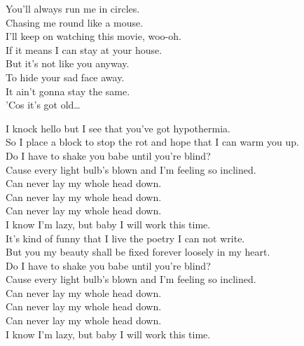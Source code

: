 You'll always run me in circles. \\
Chasing me round like a mouse. \\
I'll keep on watching this movie, woo-oh. \\
If it means I can stay at your house. \\
But it's not like you anyway. \\
To hide your sad face away. \\
It ain't gonna stay the same. \\
'Cos it's got old… \\





I knock hello but I see that you've got hypothermia. \\
So I place a block to stop the rot and hope that I can warm you up. \\
Do I have to shake you babe until you're blind? \\
Cause every light bulb's blown and I'm feeling so inclined. \\

Can never lay my whole head down. \\
Can never lay my whole head down. \\
Can never lay my whole head down. \\
I know I'm lazy, but baby I will work this time. \\

It's kind of funny that I live the poetry I can not write. \\
But you my beauty shall be fixed forever loosely in my heart. \\
Do I have to shake you babe until you're blind? \\
Cause every light bulb's blown and I'm feeling so inclined. \\

Can never lay my whole head down. \\
Can never lay my whole head down. \\
Can never lay my whole head down. \\
I know I'm lazy, but baby I will work this time. \\


